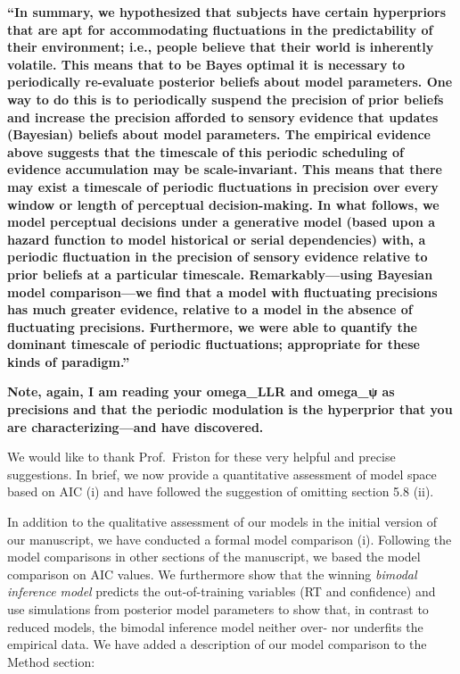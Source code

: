 \documentclass[
]{article}
\begin{document}
\textbf{``In summary, we hypothesized that subjects have certain
hyperpriors that are apt for accommodating fluctuations in the
predictability of their environment; i.e., people believe that their
world is inherently volatile. This means that to be Bayes optimal it is
necessary to periodically re-evaluate posterior beliefs about model
parameters. One way to do this is to periodically suspend the precision
of prior beliefs and increase the precision afforded to sensory evidence
that updates (Bayesian) beliefs about model parameters. The empirical
evidence above suggests that the timescale of this periodic scheduling
of evidence accumulation may be scale-invariant. This means that there
may exist a timescale of periodic fluctuations in precision over every
window or length of perceptual decision-making. In what follows, we
model perceptual decisions under a generative model (based upon a hazard
function to model historical or serial dependencies) with, a periodic
fluctuation in the precision of sensory evidence relative to prior
beliefs at a particular timescale. Remarkably---using Bayesian model
comparison---we find that a model with fluctuating precisions has much
greater evidence, relative to a model in the absence of fluctuating
precisions. Furthermore, we were able to quantify the dominant timescale
of periodic fluctuations; appropriate for these kinds of paradigm.''}

\textbf{Note, again, I am reading your omega\_LLR and omega\_ψ as
precisions and that the periodic modulation is the hyperprior that you
are characterizing---and have discovered.}

We would like to thank Prof.~Friston for these very helpful and precise
suggestions. In brief, we now provide a quantitative assessment of model
space based on AIC (i) and have followed the suggestion of omitting
section 5.8 (ii).

In addition to the qualitative assessment of our models in the initial
version of our manuscript, we have conducted a formal model comparison
(i). Following the model comparisons in other sections of the
manuscript, we based the model comparison on AIC values. We furthermore
show that the winning \emph{bimodal inference model} predicts the
out-of-training variables (RT and confidence) and use simulations from
posterior model parameters to show that, in contrast to reduced models,
the bimodal inference model neither over- nor underfits the empirical
data. We have added a description of our model comparison to the Method
section:
\end{document}
